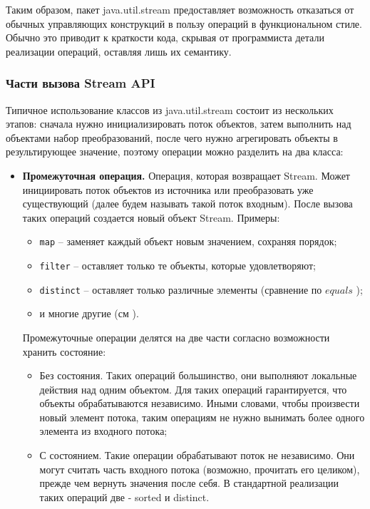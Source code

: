 Таким образом, пакет java.util.stream предоставляет возможность отказаться от обычных управляющих конструкций в пользу операций в функциональном стиле. Обычно это приводит к краткости кода, скрывая от программиста детали реализации операций, оставляя лишь их семантику.

\subsubsection{Части вызова Stream API}
Типичное использование классов из java.util.stream состоит из нескольких этапов: сначала 
нужно инициализировать поток объектов, затем выполнить над объектами набор преобразований, 
после чего нужно агрегировать объекты в результирующее значение, поэтому операции 
можно разделить на два класса:
\begin{itemize}
	\item \textbf{Промежуточная операция.} Операция, которая возвращает Stream. Может инициировать поток объектов из источника или преобразовать уже существующий (далее будем называть такой поток входным). После вызова таких операций создается новый объект Stream. Примеры:
	\begin{itemize}
		\item \texttt{map} -- заменяет каждый объект новым значением, сохраняя порядок;
		\item \texttt{filter} -- оставляет только те объекты, которые удовлетворяют;
		\item \texttt{distinct} -- оставляет только различные элементы (сравнение по $equals$ \cite{java:equals});
		\item и многие другие (см \cite{java:stream}).
	\end{itemize}
	Промежуточные операции делятся на две части согласно возможности хранить состояние:
	\begin{itemize}
		\item Без состояния. Таких операций большинство, они выполняют локальные действия над одним 
		объектом. Для таких операций гарантируется, что объекты обрабатываются независимо. Иными словами, чтобы произвести новый элемент потока, таким операциям не нужно вынимать более одного элемента из входного потока;
		\item С состоянием. Такие операции обрабатывают поток не независимо. Они могут считать часть входного потока (возможно, прочитать его целиком), прежде чем вернуть значения после себя. В стандартной реализации таких операций две - sorted и distinct.
	\end{itemize}

\end{itemize}
